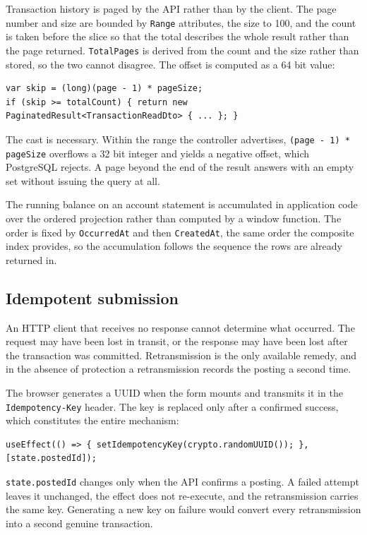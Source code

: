 \documentclass[11pt,a4paper]{article}
\newcommand{\code}[1]{\texttt{\fontsize{8.6}{10}\selectfont #1}}
\begin{document}
Transaction history is paged by the API rather than by the client. The page
number and size are bounded by \code{Range} attributes, the size to 100, and the
count is taken before the slice so that the total describes the whole result
rather than the page returned. \code{TotalPages} is derived from the count and
the size rather than stored, so the two cannot disagree. The offset is computed
as a 64 bit value:

\begin{lstlisting}
var skip = (long)(page - 1) * pageSize;
if (skip >= totalCount) { return new PaginatedResult<TransactionReadDto> { ... }; }
\end{lstlisting}

The cast is necessary. Within the range the controller advertises,
\code{(page - 1) * pageSize} overflows a 32 bit integer and yields a negative
offset, which PostgreSQL rejects. A page beyond the end of the result answers
with an empty set without issuing the query at all.

The running balance on an account statement is accumulated in application code
over the ordered projection rather than computed by a window function. The
order is fixed by \code{OccurredAt} and then \code{CreatedAt}, the same order
the composite index provides, so the accumulation follows the sequence the rows
are already returned in.

\subsection{Idempotent submission}\label{sec:idem}

An HTTP client that receives no response cannot determine what occurred. The
request may have been lost in transit, or the response may have been lost after
the transaction was committed. Retransmission is the only available remedy, and
in the absence of protection a retransmission records the posting a second
time.

The browser generates a UUID when the form mounts and transmits it in the
\code{Idempotency-Key} header. The key is replaced only after a confirmed
success, which constitutes the entire mechanism:

\begin{lstlisting}
useEffect(() => { setIdempotencyKey(crypto.randomUUID()); }, [state.postedId]);
\end{lstlisting}

\code{state.postedId} changes only when the API confirms a posting. A failed
attempt leaves it unchanged, the effect does not re-execute, and the
retransmission carries the same key. Generating a new key on failure would
convert every retransmission into a second genuine transaction.
\end{document}
